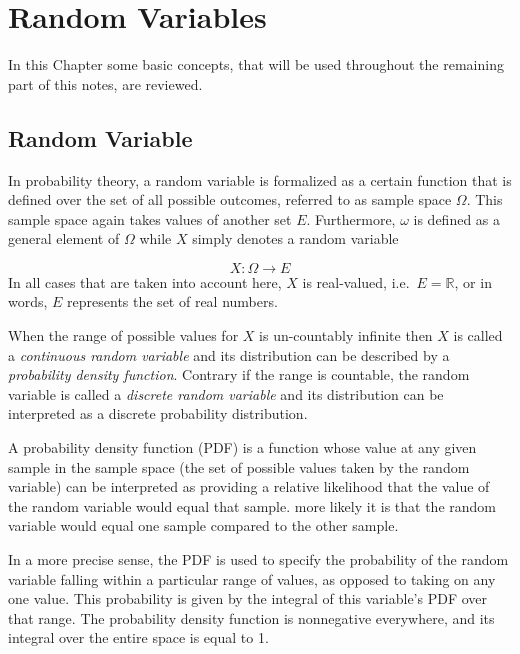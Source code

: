 \chapter{Random Variables}\label{fundamentals}

In this Chapter some basic concepts, that will be used throughout the remaining part of this notes, are reviewed.

\section{Random Variable}\label{random-variables}

In probability theory, a random variable is formalized as a
certain function that is defined over the set of all possible outcomes,
referred to as sample space \(\Omega\). This sample space again takes
values of another set \(E\). Furthermore, \(\omega\) is defined as a
general element of \(\Omega\) while \(X\) simply denotes a random
variable

\begin{equation}
	X:\Omega \rightarrow E
\end{equation}
In all cases that are taken into account here, \(X\) is real-valued,
i.e.~\(E=\mathbb {R}\), or in words, \(E\) represents the set of real
numbers.

When the range of possible values for \(X\) is un-countably infinite then \(X\) 
is called a \emph{continuous random variable} and its distribution can be described by a
\emph{probability density function}.
Contrary if the range is countable, the random
variable is called a \emph{discrete random variable} and its
distribution can be interpreted as a discrete probability distribution.

A probability density function (PDF) is a function whose value at any given sample 
in the sample space (the set of possible values taken by the random variable) 
can be interpreted as providing a relative likelihood that the value of the random variable
would equal that sample. 
more likely it is that the random variable would equal one sample compared to the other sample.

In a more precise sense, the PDF is used to specify the probability of the random variable falling 
within a particular range of values, as opposed to taking on any one value. 
This probability is given by the integral of this variable's PDF over that range.
The probability density function is nonnegative everywhere, and its integral over the entire space is equal to 1.

